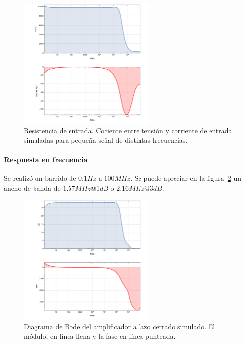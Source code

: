 \documentclass[a4paper,12pt,twoside]{article}
\begin{document}
\begin{figure}[H]
	\centering
	\includegraphics[width=0.6\textwidth]{img/sim/R_i}
	\caption{Resistencia de entrada. Cociente entre tensión y corriente de entrada simuladas para pequeña señal de distintas frecuencias.}
	\label{fig:R_i}
\end{figure}



\paragraph{Respuesta en frecuencia} 

Se realizó un barrido de $0.1Hz$ a $100MHz$. Se puede apreciar en la figura~\ref{fig:bode} un ancho de banda de $1.57MHz@1dB$ o $2.16MHz@3dB$.

\begin{figure}[H]
	\centering
	\includegraphics[width=0.6\textwidth]{img/sim/bode}
	\caption{Diagrama de Bode del amplificador a lazo cerrado simulado. El módulo, en línea llena y la fase en línea punteada.}
	\label{fig:bode}
\end{figure}
\end{document}
